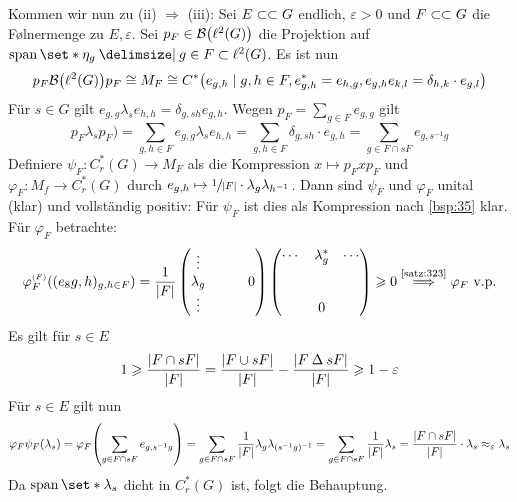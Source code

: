\begin{beweis}[name={von \autoref{satz:53}}]
	Kommen wir nun zu (ii) $\Rightarrow $ (iii):
	Sei $E \finSub G$ endlich, $\varepsilon>0$ und $F \finSub G$ die Følnermenge zu $E,\varepsilon$.
	Sei $p_F \in \mathcal{B} \enbrace*{\ell^2(G)}$ die Projektion auf $\Span \set*{\eta_g \given g \in F} \subset \ell^2(G)$.
	Es ist nun
	\[
		p_F \mathcal{B} \enbrace*{\ell^2(G)} p_F \cong M_F \cong C^* \enbrace*{e_{g,h} \mid g,h \in F, e_{g,h}^* = e_{h,g}, e_{g,h} e_{k,l} = \delta_{h,k} \cdot e_{g,l}}
	\]
	Für $s \in G$ gilt $e_{g,g} \lambda_s e_{h,h} = \delta_{g,sh} e_{g,h}$.
	Wegen $p_F = \sum_{g \in F}e_{g,g}$ gilt
	\[
		p_F \lambda_s p_F ) = \sum_{g,h \in F} e_{g,g} \lambda_s e_{h,h} = \sum_{g,h \in F} \delta_{g,sh} \cdot e_{g,h} = \sum_{g \in F \cap sF} e_{g,s^{-1}g}
	\]
	Definiere $\psi_F \colon C^*_r(G) \to M_F$ als die Kompression $x \mapsto p_F x p_F$ und $\varphi_F \colon M_f \to C^*_r(G)$ durch $e_{g,h} \mapsto \sfrac{1}{\abs{F}}\cdot \lambda_g \lambda_{h^{-1}}$.
	Dann sind $\psi_F$ und $\varphi_F$ unital (klar) und vollständig positiv: Für $\psi_F$ ist dies als Kompression nach \autoref{bsp:35} klar.
	Für $\varphi_F$ betrachte:
	\[
		\varphi_F^\ssbrace{F} \enbrace*{(e_8{g,h})_{g,h \in F}} = \frac{1}{\abs{F}} \begin{pmatrix}
			\vdots & \hphantom{\lambda_g^*}& \\
			\lambda_g & & 0 \\
			\vdots & & 
		\end{pmatrix}
		\begin{pmatrix}
			\cdots & \lambda_g^* & \cdots \\
			& & \vphantom{\vdots}\\
			& 0 & \vphantom{\vdots}
		\end{pmatrix} \ge 0 \StackText{\ref{satz:323}}{\implies} \varphi_F \text{ v.p.} 
	\]
	Es gilt für $s \in E$
	\[
		1 \ge \frac{\abs*{F \cap sF}}{\abs*{F}} = \frac{\abs*{F \cup sF}}{\abs*{F} } - \frac{\abs*{F \DeltaOp sF}}{\abs*{F}} \ge 1 - \varepsilon
	\]
	Für $s \in E$ gilt nun 
	\[
		\varphi_F \psi_F (\lambda_s) = \varphi_F \enbrace*{\sum_{g \in F \cap sF} e_{g,s^{-1}g}} = \sum_{g \in F\cap sF} \frac{1}{\abs*{F}} \lambda_g \lambda_{(s^{-1}g)^{-1}} = \sum_{g \in F \cap sF} \frac{1}{\abs*{F}} \lambda_s 
		= \frac{\abs*{F \cap sF}}{\abs*{F} }  \cdot \lambda_s \approx_\varepsilon \lambda_s
	\]
	Da $\Span \set*{\lambda_s}$ dicht in $C^*_r(G)$ ist, folgt die Behauptung.
	

\end{beweis}
